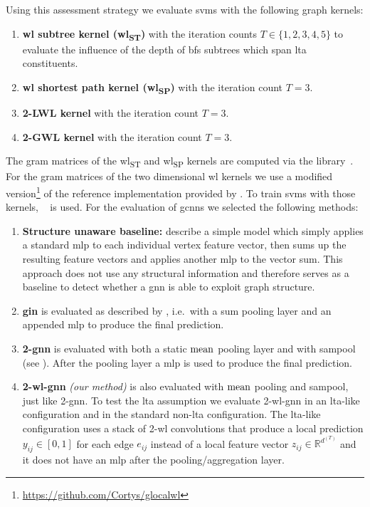 Using this assessment strategy we evaluate \acp{svm} with the following graph kernels:
\begin{enumerate}[label={\textbf{\arabic*.}},itemsep=2pt,parsep=2pt]
	\item \textbf{\ac{wl} subtree kernel (\acs{wl}\textsubscript{ST})} with the iteration counts $T \in \{ 1,2,3,4,5 \}$ to evaluate the influence of the depth of \ac{bfs} subtrees which span \ac{lta} constituents.
	\item \textbf{\ac{wl} shortest path kernel (\acs{wl}\textsubscript{SP})} with the iteration count $T = 3$.
	\item \textbf{2-LWL kernel} with the iteration count $T = 3$.
	\item \textbf{2-GWL kernel} with the iteration count $T = 3$.
\end{enumerate}
The gram matrices of the \acs{wl}\textsubscript{ST} and \acs{wl}\textsubscript{SP} kernels are computed via the  library~\cite{Siglidis2018}\cite{GK}.
For the gram matrices of the two dimensional \ac{wl} kernels we use a modified version\footnote{\url{https://github.com/Cortys/glocalwl}} of the reference implementation provided by \citet{Morris2017}.
To train \acp{svm} with those kernels, ~\cite{Pedregosa2011}\cite{SKL} is used.
For the evaluation of \acp{gcnn} we selected the following methods:
\begin{enumerate}[label={\textbf{\arabic*.}},itemsep=2pt,parsep=2pt]
	\item \textbf{Structure unaware baseline:}
		\citet{Errica2020} describe a simple model which simply applies a standard \ac{mlp} to each individual vertex feature vector, then sums up the resulting feature vectors and applies another \ac{mlp} to the vector sum.
		This approach does not use any structural information and therefore serves as a baseline to detect whether a \ac{gnn} is able to exploit graph structure.
	\item \textbf{\ac{gin}} is evaluated as described by \citet{Xu2018}, i.e.\ with a sum pooling layer and an appended \ac{mlp} to produce the final prediction.
	\item \textbf{2-\acs{gnn}} is evaluated with both a static $\operatorname{mean}$ pooling layer and with \ac{sampool} (see ).
		After the pooling layer a \ac{mlp} is used to produce the final prediction.
	\item \textbf{2-\acs{wl}-\ac{gnn}} \textit{(our method)} is also evaluated with $\operatorname{mean}$ pooling and \ac{sampool}, just like 2-\ac{gnn}.
		To test the \ac{lta} assumption we evaluate 2-\acs{wl}-\acs{gnn} in an \acs{lta}-like configuration and in the standard non-\acs{lta} configuration.
		The \acs{lta}-like configuration uses a stack of 2-\acs{wl} convolutions that produce a local prediction $y_{ij} \in [0, 1]$ for each edge $e_{ij}$ instead of a local feature vector $z_{ij} \in \mathbb{R}^{d^{(T)}}$ and it does not have an \ac{mlp} after the pooling/aggregation layer.
\end{enumerate}
